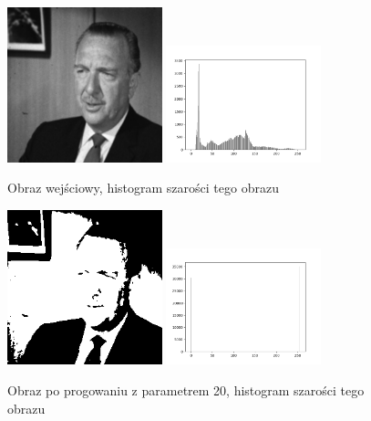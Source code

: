 \documentclass[final,a4paper,openany,12pt]{mwbk}
\begin{document}
\begin{figure}[H]
	\begin{center}
		\includegraphics[width=0.4\textwidth]{gentelman_gray}
		\includegraphics[width=0.4\textwidth]{gentelman_gray_histogram}
	\end{center}
	\caption{Obraz wejściowy, histogram szarości tego obrazu}
\end{figure}

\begin{figure}[H]
	\begin{center}
		\includegraphics[width=0.4\textwidth]{gentelman_gray_globThreshold_result}
		\includegraphics[width=0.4\textwidth]{gentelman_gray_globThreshold_histogram}
	\end{center}
	\caption{Obraz po progowaniu z parametrem 20, histogram szarości tego obrazu}
\end{figure}
\end{document}
